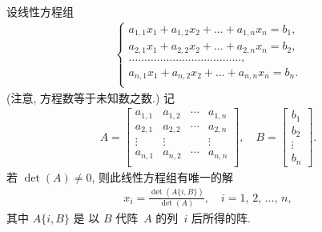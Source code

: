 \begin{theorem}[Cramer 公式, 2]
    设线性方程组
    \begin{align*}
        \begin{cases}
            a_{1,1} x_1 + a_{1,2} x_2 + \dots
            + a_{1,n} x_n = b_1, \\
            a_{2,1} x_1 + a_{2,2} x_2 + \dots
            + a_{2,n} x_n = b_2, \\
            \dots \dots \dots \dots
            \dots \dots \dots \dots
            \dots \dots \dots \dots,
            \\
            a_{n,1} x_1 + a_{n,2} x_2 + \dots
            + a_{n,n} x_n = b_n. \\
        \end{cases}
    \end{align*}
    (注意, 方程数等于未知数之数.)
    记
    \begin{align*}
        A =
        \begin{bmatrix}
            a_{1,1} & a_{1,2} & \cdots & a_{1,n} \\
            a_{2,1} & a_{2,2} & \cdots & a_{2,n} \\
            \vdots  & \vdots  & {}     & \vdots  \\
            a_{n,1} & a_{n,2} & \cdots & a_{n,n} \\
        \end{bmatrix},
        \quad
        B =
        \begin{bmatrix}
            b_1 \\ b_2 \\ \vdots \\ b_n
        \end{bmatrix}.
    \end{align*}
    若 \(\det {(A)} \neq 0\),
    则此线性方程组有唯一的解
    \begin{align*}
        x_i = \frac{\det {(A \{i, B\})}}{\det {(A)}},
        \quad
        \text{\(i = 1\), \(2\), \(\dots\), \(n\)},
    \end{align*}
    其中 \(A \{i, B\}\) 是%
    以 \(B\) 代阵~\(A\) 的列~\(i\) 后所得的阵.
\end{theorem}


